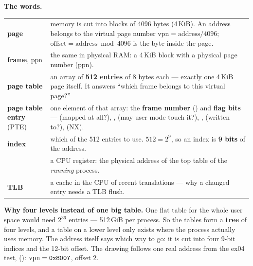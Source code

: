 \documentclass[11pt]{report}
\begin{document}
\textbf{The words.}
\begin{center}
\small
\begin{tabular}{L{3.4cm}L{11.6cm}}
\toprule
\textbf{page} & memory is cut into blocks of 4096 bytes (4\,KiB). An address belongs to the virtual page number
  $\text{vpn} = \text{address} / 4096$; $\text{offset} = \text{address} \bmod 4096$ is the byte inside the page. \\
\textbf{frame}, ppn & the same in physical RAM: a 4\,KiB block with a physical page number (ppn). \\
\textbf{page table} & an array of \textbf{512 entries} of 8 bytes each --- exactly one 4\,KiB page itself.
  It answers ``which frame belongs to this virtual page?'' \\
\textbf{page table entry} (PTE) & one element of that array: the \textbf{frame number} () and
  \textbf{flag bits} ---  (mapped at all?), ,  (may user
  mode touch it?), ,  (written to?),  (NX). \\
\textbf{index} & which of the 512 entries to use. $512 = 2^9$, so an index is \textbf{9 bits} of the address. \\
 & a CPU register: the physical address of the top table of the \emph{running} process. \\
\textbf{TLB} & a cache in the CPU of recent translations --- why a changed entry needs a TLB flush. \\
\bottomrule
\end{tabular}
\end{center}

\textbf{Why four levels instead of one big table.} One flat table for the whole user space would
need $2^{36}$ entries --- 512\,GiB per process. So the tables form a \textbf{tree} of four levels, and a
table on a lower level only exists where the process actually uses memory. The address itself says
which way to go: it is cut into four 9-bit indices and the 12-bit offset. The drawing follows one
real address from the ex04 test,  (): $\text{vpn} = \texttt{0x8007}$,
offset 2.
\end{document}
